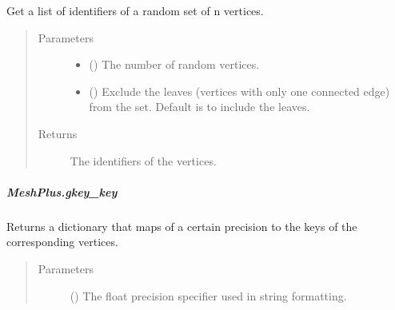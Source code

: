 \documentclass[letterpaper,10pt,english]{sphinxmanual}
\begin{document}
\begin{fulllineitems}
\begin{fulllineitems}
\label{\detokenize{api/generated/directional_clustering.mesh.MeshPlus.get_any_vertices:directional_clustering.mesh.MeshPlus.get_any_vertices}}
Get a list of identifiers of a random set of n vertices.
\begin{quote}\begin{description}
\item[{Parameters}] \leavevmode\begin{itemize}
\item {} 
 () \textendash{} The number of random vertices.

\item {} 
 () \textendash{} Exclude the leaves (vertices with only one connected edge) from the set.
Default is to include the leaves.

\end{itemize}

\item[{Returns}] \leavevmode
{} \textendash{} The identifiers of the vertices.

\end{description}\end{quote}

\end{fulllineitems}



\subparagraph{MeshPlus.gkey\_key}
\label{\detokenize{api/generated/directional_clustering.mesh.MeshPlus.gkey_key:meshplus-gkey-key}}\label{\detokenize{api/generated/directional_clustering.mesh.MeshPlus.gkey_key::doc}}

\begin{fulllineitems}
\label{\detokenize{api/generated/directional_clustering.mesh.MeshPlus.gkey_key:directional_clustering.mesh.MeshPlus.gkey_key}}
Returns a dictionary that maps  of a certain precision
to the keys of the corresponding vertices.
\begin{quote}\begin{description}
\item[{Parameters}] \leavevmode
{} () \textendash{} The float precision specifier used in string formatting.


\end{description}
\end{quote}
\end{fulllineitems}
\end{fulllineitems}
\end{document}
